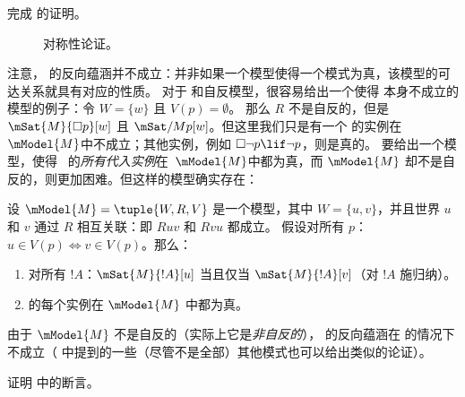 \documentclass[../../../include/open-logic-section]{subfiles}
\begin{document}
\begin{prob}
  完成  的证明。
\end{prob}

\begin{figure}
  \begin{center}
  \end{center}
\caption{对称性论证。}
\end{figure}

注意， 的反向蕴涵并不成立：并非如果一个模型使得一个模式为真，该模型的可达关系就具有对应的性质。
对于  和自反模型，很容易给出一个使得  本身不成立的模型的例子：令 $W = \{w\}$ 且 $V(p) = \emptyset$。
那么 $R$ 不是自反的，但是 $\mSat{M}{\Box
  p}[w]$ 且 $\mSat/{M}{p}[w]$。但这里我们只是有一个  的实例在~$\mModel{M}$中不成立；其他实例，例如 $\Box \lnot p \lif \lnot p$，则是真的。
要给出一个模型，使得~ 的\emph{所有代入实例}在~$\mModel{M}$中都为真，而 $\mModel{M}$ 却不是自反的，则更加困难。但这样的模型确实存在：

\begin{prop}
  设 $\mModel{M} = \tuple{W, R, V}$ 是一个模型，其中 $W = \{u, v
  \}$，并且世界 $u$ 和 $v$ 通过 $R$ 相互关联：即 $Ruv$ 和 $Rvu$ 都成立。
  假设对所有 $p$：$u \in V(p) \Leftrightarrow v
  \in V(p)$。那么：
  \begin{enumerate}
  \item 对所有 $!A$：$\mSat{M}{!A}[u]$ 当且仅当
    $\mSat{M}{!A}[v]$（对 $!A$ 施归纳）。
  \item {} 的每个实例在 $\mModel{M}$ 中都为真。
  \end{enumerate}
  由于 $\mModel{M}$ 不是自反的（实际上它是\emph{非自反的}），
   的反向蕴涵在  的情况下不成立（ 中提到的一些（尽管不是全部）其他模式也可以给出类似的论证）。
\end{prop}

\begin{prob}
  证明  中的断言。
\end{prob}
\end{document}
